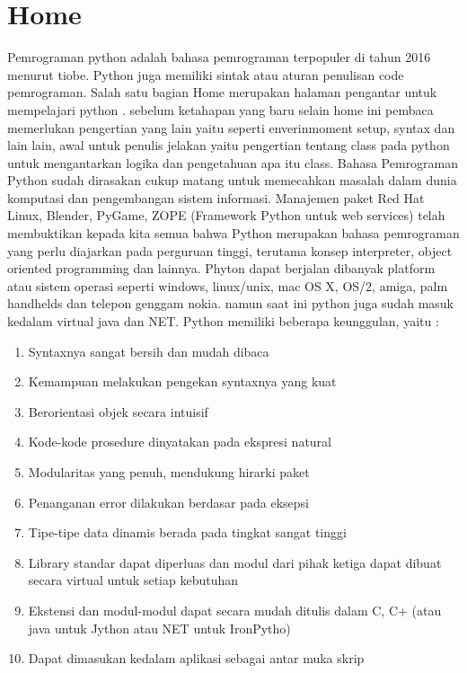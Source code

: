 
\section{Home}
	Pemrograman python adalah bahasa pemrograman terpopuler di tahun 2016 menurut tiobe. Python juga memiliki sintak atau aturan penulisan code pemrograman. Salah satu bagian Home merupakan halaman pengantar untuk mempelajari python . sebelum ketahapan yang baru selain home ini pembaca memerlukan pengertian yang lain yaitu seperti enverinmoment setup, syntax dan lain lain, awal untuk penulis jelakan yaitu pengertian tentang class pada python untuk mengantarkan logika dan pengetahuan apa itu class.
	Bahasa Pemrograman Python sudah dirasakan cukup matang untuk memecahkan masalah dalam dunia komputasi dan pengembangan sistem informasi. Manajemen paket Red Hat Linux, Blender,  PyGame, ZOPE (Framework Python untuk web services) telah membuktikan kepada kita semua bahwa Python merupakan bahasa pemrograman yang perlu diajarkan pada perguruan tinggi, terutama konsep interpreter, object oriented programming dan lainnya.
	Phyton dapat berjalan dibanyak platform atau sistem operasi seperti windows, linux/unix, mac OS X, OS/2, amiga, palm handhelds dan telepon genggam nokia. namun saat ini python juga sudah masuk kedalam virtual java dan NET. Python memiliki beberapa keunggulan, yaitu :
\begin{enumerate}
\item Syntaxnya sangat bersih dan mudah dibaca
\item Kemampuan melakukan pengekan syntaxnya yang kuat
\item Berorientasi objek secara intuisif
\item Kode-kode prosedure dinyatakan pada ekspresi natural
\item Modularitas yang penuh, mendukung hirarki paket
\item Penanganan error dilakukan berdasar pada eksepsi
\item Tipe-tipe data dinamis berada pada tingkat sangat tinggi
\item Library standar dapat diperluas dan modul dari pihak ketiga dapat dibuat secara virtual untuk setiap kebutuhan
\item Ekstensi dan modul-modul dapat secara mudah ditulis dalam C, C+ (atau java untuk Jython atau NET untuk IronPytho)
\item Dapat dimasukan kedalam aplikasi sebagai antar muka skrip
\end{enumerate}

